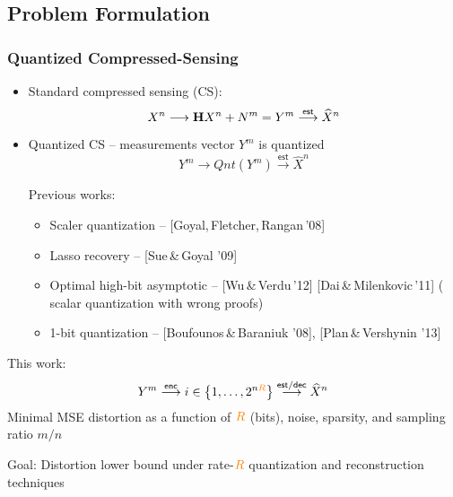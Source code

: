 \documentclass{beamer}
\newcommand{\Xc}{{\color{black} X}}
\newcommand{\Rc}{{\color{orange} R}}
\newcommand{\enc}{\mathsf{enc}}
\begin{document}
\subsection{Problem Formulation}
\begin{frame}
\frametitle{Quantized Compressed-Sensing}
\begin{itemize}
\item Standard compressed sensing (CS):
\[
\Xc^n \longrightarrow \mathbf H {\Xc^n} + N^m = {Y^m}  \overset{\mathsf{est}}{\longrightarrow} {\widehat{X}^n}
\]
\item Quantized CS -- measurements vector $Y^m$ is quantized
\[
Y^m \longrightarrow Qnt(Y^m) \overset{\mathsf{est}}{\longrightarrow} {\widehat{X}^n}
\]

Previous works:
\begin{itemize} 
\item Scaler quantization -- [Goyal,\,Fletcher,\,Rangan\,'08]
\item Lasso recovery --  [Sue\,\&\,Goyal '09]
\item Optimal high-bit asymptotic -- [Wu\,\&\,Verdu\,'12]
[Dai\,\&\,Milenkovic\,'11] ({\color{red} scalar quantization with wrong proofs})
\item 1-bit quantization -- [Boufounos\,\&\,Baraniuk '08],  [Plan\,\&\,Vershynin '13]
\end{itemize}
\end{itemize}
\end{frame}

\begin{frame}
\begin{alertblock}{This work:} 
\[
Y^m \overset{\enc}{\longrightarrow} i \in \left\{1,\ldots, 2^{n\Rc}\right\} \overset{\mathsf{est/dec}}{\longrightarrow} {\widehat{X}^n}
\]
Minimal MSE distortion as a function of $\Rc$ (bits), noise, sparsity, and sampling ratio $m/n$ 
\end{alertblock}

\begin{alertblock}{Goal:}
Distortion lower bound under {\color{red}{any}} rate-$\Rc$ quantization and reconstruction techniques
\end{alertblock}
\end{frame}
\end{document}
